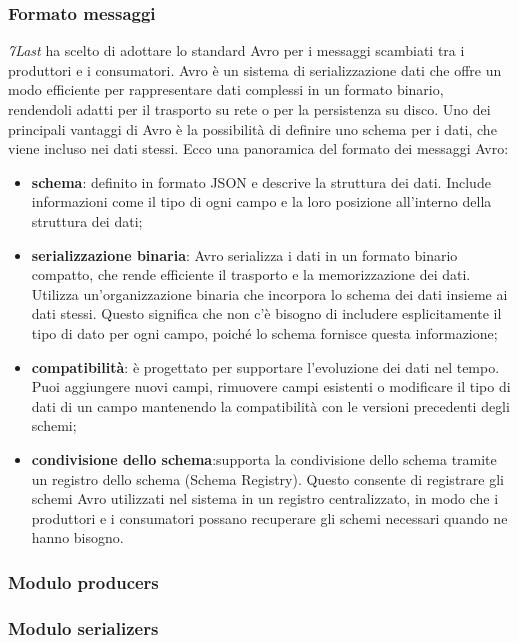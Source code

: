 \subsubsection{Formato messaggi}
\textit{7Last} ha scelto di adottare lo standard Avro per i messaggi scambiati tra i produttori e i consumatori. Avro è un sistema di serializzazione dati che offre un modo efficiente per rappresentare dati complessi in un formato binario, rendendoli adatti per il trasporto su rete o per la persistenza su disco. Uno dei principali vantaggi di Avro è la possibilità di definire uno schema per i dati, che viene incluso nei dati stessi. Ecco una panoramica del formato dei messaggi Avro:
\begin{itemize}
    \item \textbf{schema}: definito in formato JSON e descrive la struttura dei dati. Include informazioni come il tipo di ogni campo e la loro posizione all'interno della struttura dei dati;
    \item \textbf{serializzazione binaria}: Avro serializza i dati in un formato binario compatto, che rende efficiente il trasporto e la memorizzazione dei dati. Utilizza un'organizzazione binaria che incorpora lo schema dei dati insieme ai dati stessi. Questo significa che non c'è bisogno di includere esplicitamente il tipo di dato per ogni campo, poiché lo schema fornisce questa informazione;
    \item \textbf{compatibilità}: è progettato per supportare l'evoluzione dei dati nel tempo. Puoi aggiungere nuovi campi, rimuovere campi esistenti o modificare il tipo di dati di un campo mantenendo la compatibilità con le versioni precedenti degli schemi;
    \item \textbf{condivisione dello schema}:supporta la condivisione dello schema tramite un registro dello schema (Schema Registry). Questo consente di registrare gli schemi Avro utilizzati nel sistema in un registro centralizzato, in modo che i produttori e i consumatori possano recuperare gli schemi necessari quando ne hanno bisogno.
\end{itemize}

\subsubsection{Modulo producers}
\subsubsection{Modulo serializers}
